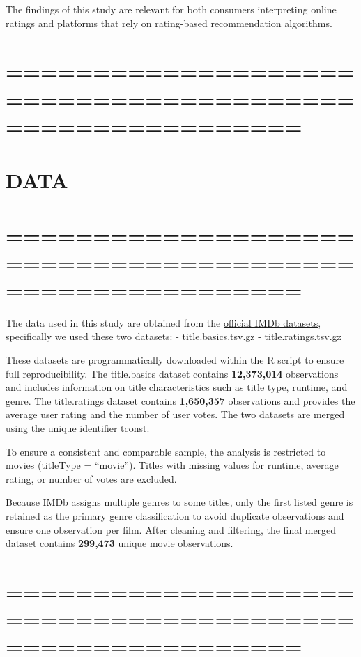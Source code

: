 \documentclass[
]{article}
\begin{document}
The findings of this study are relevant for both consumers interpreting
online ratings and platforms that rely on rating-based recommendation
algorithms.

\section{=========================================================}\label{section-2}

\section{DATA}\label{data}

\section{=========================================================}\label{section-3}

The data used in this study are obtained from the
\href{https://datasets.imdbws.com/}{official IMDb datasets},
specifically we used these two datasets: -
\href{https://datasets.imdbws.com/title.basics.tsv.gz}{title.basics.tsv.gz}
-
\href{https://datasets.imdbws.com/title.ratings.tsv.gz}{title.ratings.tsv.gz}

These datasets are programmatically downloaded within the R script to
ensure full reproducibility. The title.basics dataset contains
\textbf{12,373,014} observations and includes information on title
characteristics such as title type, runtime, and genre. The
title.ratings dataset contains \textbf{1,650,357} observations and
provides the average user rating and the number of user votes. The two
datasets are merged using the unique identifier tconst.

To ensure a consistent and comparable sample, the analysis is restricted
to movies (titleType = ``movie''). Titles with missing values for
runtime, average rating, or number of votes are excluded.

Because IMDb assigns multiple genres to some titles, only the first
listed genre is retained as the primary genre classification to avoid
duplicate observations and ensure one observation per film. After
cleaning and filtering, the final merged dataset contains
\textbf{299,473} unique movie observations.

\section{=========================================================}\label{section-4}
\end{document}
